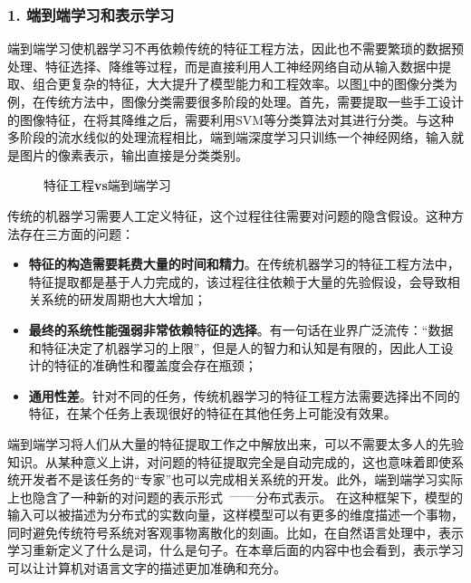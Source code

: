 
\subsubsection{1. 端到端学习和表示学习}

\parinterval 端到端学习使机器学习不再依赖传统的特征工程方法，因此也不需要繁琐的数据预处理、特征选择、降维等过程，而是直接利用人工神经网络自动从输入数据中提取、组合更复杂的特征，大大提升了模型能力和工程效率。以图\ref{fig:9-2}中的图像分类为例，在传统方法中，图像分类需要很多阶段的处理。首先，需要提取一些手工设计的图像特征，在将其降维之后，需要利用SVM等分类算法对其进行分类。与这种多阶段的流水线似的处理流程相比，端到端深度学习只训练一个神经网络，输入就是图片的像素表示，输出直接是分类类别。

\begin{figure}[htp]
\centering

\caption{特征工程{\small\sffamily\bfseries{vs}}端到端学习}
\label{fig:9-2}
\end{figure}

\parinterval 传统的机器学习需要人工定义特征，这个过程往往需要对问题的隐含假设。这种方法存在三方面的问题：

\begin{itemize}
\vspace{0.5em}
\item {\small\sffamily\bfseries{特征的构造需要耗费大量的时间和精力}}。在传统机器学习的特征工程方法中，特征提取都是基于人力完成的，该过程往往依赖于大量的先验假设，会导致相关系统的研发周期也大大增加；
\vspace{0.5em}
\item {\small\sffamily\bfseries{最终的系统性能强弱非常依赖特征的选择}}。有一句话在业界广泛流传：“数据和特征决定了机器学习的上限”，但是人的智力和认知是有限的，因此人工设计的特征的准确性和覆盖度会存在瓶颈；
\vspace{0.5em}
\item {\small\sffamily\bfseries{通用性差}}。针对不同的任务，传统机器学习的特征工程方法需要选择出不同的特征，在某个任务上表现很好的特征在其他任务上可能没有效果。
\vspace{0.5em}
\end{itemize}

\parinterval 端到端学习将人们从大量的特征提取工作之中解放出来，可以不需要太多人的先验知识。从某种意义上讲，对问题的特征提取完全是自动完成的，这也意味着即使系统开发者不是该任务的“专家”也可以完成相关系统的开发。此外，端到端学习实际上也隐含了一种新的对问题的表示形式\ $\dash$分布式表示。 在这种框架下，模型的输入可以被描述为分布式的实数向量，这样模型可以有更多的维度描述一个事物，同时避免传统符号系统对客观事物离散化的刻画。比如，在自然语言处理中，表示学习重新定义了什么是词，什么是句子。在本章后面的内容中也会看到，表示学习可以让计算机对语言文字的描述更加准确和充分。

